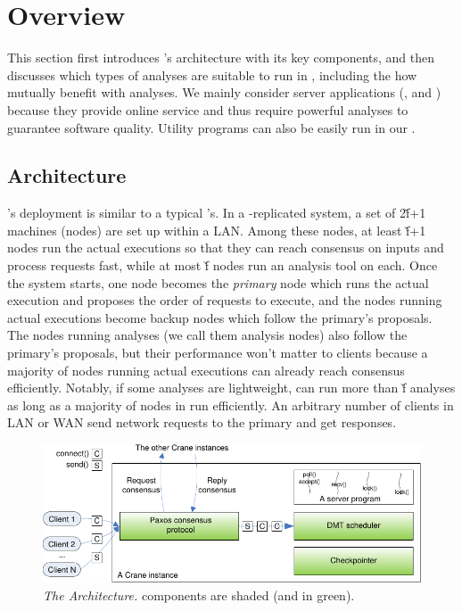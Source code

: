 \section{\xxx Overview} \label{sec:overview}

This section first introduces \xxx's architecture with its key components, and 
then discusses which types of analyses are suitable to run in \xxx, including 
the how \xxx mutually benefit with analyses. We mainly consider server 
applications (\eg, \mediatomb and \apache) because they provide online service 
and thus require powerful analyses to guarantee software quality. Utility 
programs can also be easily run in our \xxx.

\subsection{Architecture} \label{sec:arch}

\xxx's deployment is similar to a typical \smr's. In a \xxx-replicated
system, a set of 2\v{f}+1 machines (nodes) are set up within a LAN. Among these 
nodes, at least \v{f}+1 nodes run the actual executions so that 
they can reach consensus on inputs and process requests fast, while at most 
\v{f} nodes run an analysis tool on each. Once the \xxx system starts, 
one node becomes the \emph{primary} node which runs the actual execution and 
proposes the order of requests to execute, and the nodes running actual 
executions become backup nodes which follow the primary's proposals. The nodes 
running analyses (we call them analysis nodes) also follow the primary's 
proposals, but their performance won't matter to clients because a majority of 
nodes running actual executions can already reach consensus efficiently. 
Notably, if some analyses are lightweight, \xxx can run more than \v{f} 
analyses as long as a majority of nodes in \xxx run efficiently. An arbitrary 
number of clients in LAN or WAN send network requests to the primary and get 
responses. 


\begin{figure}[t]
\vspace{.20in}
\centering
\includegraphics[width=.5\textwidth]{figures/arch}
\vspace{-.20in}
\caption{{\em The \xxx Architecture.} \xxx components are shaded (and in
  green).} \label{fig:arch}
\vspace{-.05in}
\end{figure}

